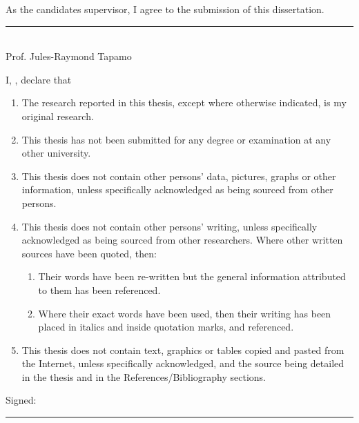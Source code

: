 \documentclass[
11pt, %
english, %
onehalfspacing, %
liststotoc, %
headsepline, %
]{MastersDoctoralThesis} %
\begin{document}
\begin{declarationsupervisor}
	\addchaptertocentry{\decsupervisorname}
	
	As the candidates supervisor, I agree to the submission of this dissertation.
	
	\vfill
	
	\noindent \rule[0.5em]{25em}{0.5pt} %
	\\ \noindent Prof. Jules-Raymond Tapamo
		
\end{declarationsupervisor}

\cleardoublepage

\begin{declarationplagiarism}
	\addchaptertocentry{\decplagiarismname}
	
	I, \authorname, declare that
	\begin{enumerate}
		\item The research reported in this thesis, except where otherwise indicated, is my original research.
		
		\item This thesis has not been submitted for any degree or examination at any other university.
		
		\item This thesis does not contain other persons' data, pictures, graphs or other information, unless specifically acknowledged as being sourced from other persons.
		
		\item This thesis does not contain other persons' writing, unless specifically acknowledged as being sourced from other researchers. Where other written sources have been quoted, then:
		\begin{enumerate}
			\item Their words have been re-written but the general information attributed to them has been referenced.
			
			\item Where their exact words have been used, then their writing has been placed in italics and inside quotation marks, and referenced.
		\end{enumerate}
	
		\item This thesis does not contain text, graphics or tables copied and pasted from the Internet, unless specifically acknowledged, and the source being detailed in the thesis and in the References/Bibliography sections.\\
	\end{enumerate}

	\vfill

	\noindent Signed:\\
	\rule[0.5em]{25em}{0.5pt} %
\end{declarationplagiarism}
\end{document}
